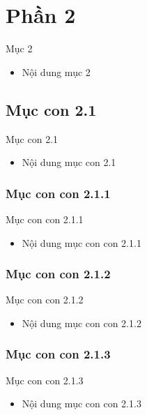 \documentclass{beamer}
\begin{document}
\section{Phần 2}
\begin{frame}{Mục 2}
\begin{itemize}
\item Nội dung mục 2
\end{itemize}
\end{frame}

\subsection{Mục con 2.1}
\begin{frame}{Mục con 2.1}
\begin{itemize}
\item Nội dung mục con 2.1
\end{itemize}
\end{frame}

\subsubsection{Mục con con 2.1.1}
\begin{frame}{Mục con con 2.1.1}
\begin{itemize}
\item Nội dung mục con con 2.1.1
\end{itemize}
\end{frame}

\subsubsection{Mục con con 2.1.2}
\begin{frame}{Mục con con 2.1.2}
\begin{itemize}
\item Nội dung mục con con 2.1.2
\end{itemize}
\end{frame}

\subsubsection{Mục con con 2.1.3}
\begin{frame}{Mục con con 2.1.3}
\begin{itemize}
\item Nội dung mục con con 2.1.3
\end{itemize}
\end{frame}
\end{document}
